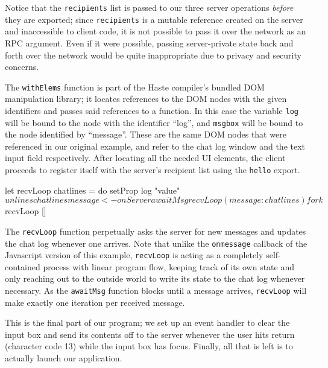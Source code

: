 \documentclass[preprint]{sigplanconf}
\begin{document}
Notice that the \lstinline!recipients! list is passed to our three server
operations \emph{before} they are exported; since \lstinline!recipients! is
a mutable reference created on the server and inaccessible to client code,
it is not possible to pass it over the network as an RPC argument.
Even if it were possible, passing server-private state back and forth over the
network would be quite inappropriate due to privacy and security concerns.

The \lstinline!withElems! function is part of the Haste compiler's bundled DOM
manipulation library; it locates references to the DOM nodes with the given
identifiers and passes said references to a function.
In this case the variable \lstinline!log! will be bound to the node
with the identifier ``log'', and \lstinline!msgbox! will be bound to the node
identified by ``message''. These are the same DOM nodes that were referenced in
our original example, and refer to the chat log window and the text input
field respectively. After locating all the needed UI elements, the client
proceeds to register itself with the server's recipient list using the
\lstinline!hello! export.

\begin{code}
      let recvLoop chatlines = do
            setProp log "value" $ unlines chatlines
            message <- onServer awaitMsg
            recvLoop (message : chatlines)
      fork $ recvLoop []
\end{code}

The \lstinline!recvLoop! function perpetually asks the server for new messages
and updates the chat log whenever one arrives. Note that unlike the
\lstinline!onmessage! callback of the Javascript version of this example,
\lstinline!recvLoop! is acting as a completely self-contained process with
linear program flow, keeping track of its own state and only reaching out to
the outside world to write its state to the chat log whenever necessary. As
the \lstinline!awaitMsg! function blocks until a message arrives,
\lstinline!recvLoop! will make exactly one iteration per received message.


This is the final part of our program; we set up an event handler to clear the
input box and send its contents off to the server whenever the user hits return
(character code 13) while the input box has focus. Finally, all that is left
is to actually launch our application.
\end{document}
